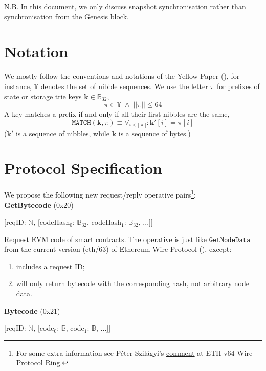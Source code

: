 \documentclass{amsart}
\begin{document}
N.B. In this document, we only discuss snapshot synchronisation rather than synchronisation from the Genesis block.

\section{Notation}

We mostly follow the conventions and notations of the Yellow Paper (\cite{yellow_paper}),
for instance, $\mathbb{Y}$ denotes the set of nibble sequences.
We use the letter $\pi$ for prefixes of state or storage trie keys $\mathbf{k} \in \mathbb{B}_{32}$,
\begin{equation}
    \pi \in \mathbb{Y} \; \land \; ||\pi|| \leq 64
\end{equation}
A key matches a prefix if and only if all their first nibbles are the same,
\begin{equation}
    \texttt{MATCH}(\mathbf{k}, \pi) \equiv \forall_{i < ||\pi||}: \mathbf{k}'[i] = \pi[i]
\end{equation}
($\mathbf{k}'$ is a sequence of nibbles, while $\mathbf{k}$ is a sequence of bytes.)

\section{Protocol Specification}

We propose the following new request/reply operative pairs\footnote{For
some extra information see Péter Szilágyi's
\href{https://ethereum-magicians.org/t/forming-a-ring-eth-v64-wire-protocol-ring/2857/10}{comment}
at ETH v64 Wire Protocol Ring.}:\\

\textbf{GetBytecode} (0x20)

[reqID: $\mathbb{N}$,
[codeHash$_0$: $\mathbb{B}_{32}$, codeHash$_1$: $\mathbb{B}_{32}$, ...]]
\medskip

Request EVM code of smart contracts.
The operative is just like $\texttt{GetNodeData}$ from the current version (eth/63) of Ethereum Wire Protocol (\cite{wire_protocol}), except:
\begin{enumerate}
\item includes a request ID;
\item will only return bytecode with the corresponding hash, not arbitrary node data.
\end{enumerate}
\bigskip

\textbf{Bytecode} (0x21)

[reqID: $\mathbb{N}$,
[code$_0$: $\mathbb{B}$, code$_1$: $\mathbb{B}$, ...]]
\medskip
\end{document}
